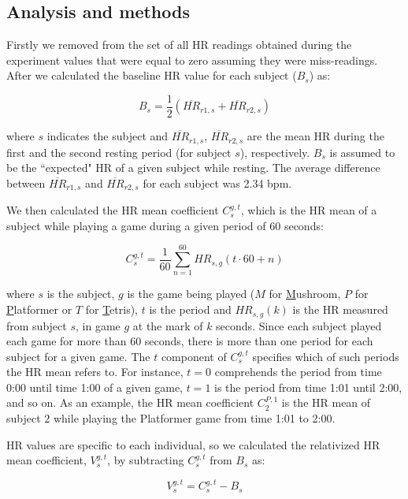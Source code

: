 \subsection{Analysis and methods}

Firstly we removed from the set of all HR readings obtained during the experiment values that were equal to zero assuming they were miss-readings. After we calculated the baseline HR value for each subject ($B_s$) as:

\begin{equation} \label{eq:baseline}
B_s = \frac{1}{2}(\overline{HR}_{r1,s} + \overline{HR}_{r2,s})
\end{equation}

where $s$ indicates the subject and $\overline{HR}_{r1,s}$, $\overline{HR}_{r2,s}$ are the mean HR during the first and the second resting period (for subject $s$), respectively. $B_s$ is assumed to be the ``expected" HR of a given subject while resting. The average difference between $\overline{HR}_{r1,s}$ and $\overline{HR}_{r2,s}$ for each subject was 2.34 bpm.

We then calculated the HR mean coefficient $C_s^{g,t}$, which is the HR mean of a subject while playing a game during a given period of 60 seconds:

\begin{equation} \label{eq:variation}
C_s^{g,t} = \frac{1}{60}\sum_{n=1}^{60} HR_{s,g}(t\cdot 60 + n)
\end{equation}

where $s$ is the subject, $g$ is the game being played ($M$ for \underline{M}ushroom, $P$ for \underline{P}latformer or $T$ for \underline{T}etris), $t$ is the period and $HR_{s,g}(k)$ is the HR measured from subject $s$, in game $g$ at the mark of $k$ seconds. Since each subject played each game for more than 60 seconds, there is more than one period for each subject for a given game. The $t$ component of $C_s^{g,t}$ specifies which of such periods the HR mean refers to. For instance, $t=0$ comprehends the period from time 0:00 until time 1:00 of a given game, $t=1$ is the period from time 1:01 until 2:00, and so on. As an example, the HR mean coefficient $C_2^{P,1}$ is the HR mean of subject $2$ while playing the Platformer game from time 1:01 to 2:00.

HR values are specific to each individual, so we calculated the relativized HR mean coefficient, $V_s^{g,t}$, by subtracting $C_s^{g,t}$ from $B_s$ as:

\begin{equation} \label{eq:variation-normalized}
V_s^{g,t} = C_s^{g,t} - B_s
\end{equation}

